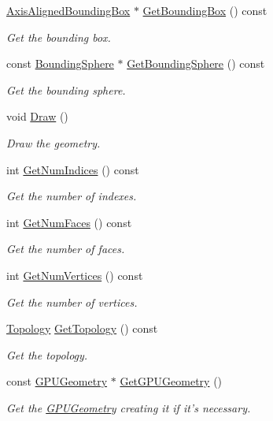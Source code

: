 \begin{DoxyCompactItemize}
\hyperlink{class_axis_aligned_bounding_box}{Axis\+Aligned\+Bounding\+Box} $\ast$ \hyperlink{class_geometry_a47a404fd7a0f65d0293b7133854d30c1}{Get\+Bounding\+Box} () const 
\begin{DoxyCompactList}\small\item\em Get the bounding box. \end{DoxyCompactList}\item 
const \hyperlink{class_bounding_sphere}{Bounding\+Sphere} $\ast$ \hyperlink{class_geometry_a9ca25aebc470b9f0866f53062a2468fc}{Get\+Bounding\+Sphere} () const 
\begin{DoxyCompactList}\small\item\em Get the bounding sphere. \end{DoxyCompactList}\item 
void \hyperlink{class_geometry_a164925c8b8713b573e3a50e54bff287a}{Draw} ()
\begin{DoxyCompactList}\small\item\em Draw the geometry. \end{DoxyCompactList}\item 
int \hyperlink{class_geometry_a72aa8f1408f2a037f9324d576b358afc}{Get\+Num\+Indices} () const 
\begin{DoxyCompactList}\small\item\em Get the number of indexes. \end{DoxyCompactList}\item 
int \hyperlink{class_geometry_a77ca9c5585d158cf69e4cd075ce3a81d}{Get\+Num\+Faces} () const 
\begin{DoxyCompactList}\small\item\em Get the number of faces. \end{DoxyCompactList}\item 
int \hyperlink{class_geometry_a69a4bb6e88c4c458602eb8a0fa1f13e7}{Get\+Num\+Vertices} () const 
\begin{DoxyCompactList}\small\item\em Get the number of vertices. \end{DoxyCompactList}\item 
\hyperlink{class_geometry_af0136a3b268286ee5921cc6af5239293}{Topology} \hyperlink{class_geometry_a2777696371d4cbc5a1a6b46bed273b96}{Get\+Topology} () const 
\begin{DoxyCompactList}\small\item\em Get the topology. \end{DoxyCompactList}\item 
const \hyperlink{class_g_p_u_geometry}{G\+P\+U\+Geometry} $\ast$ \hyperlink{class_geometry_a3b7103a7919fed0d1aafa3e4dc1c6cb2}{Get\+G\+P\+U\+Geometry} ()
\begin{DoxyCompactList}\small\item\em Get the \hyperlink{class_g_p_u_geometry}{G\+P\+U\+Geometry} creating it if it's necessary. \end{DoxyCompactList}\end{DoxyCompactItemize}
